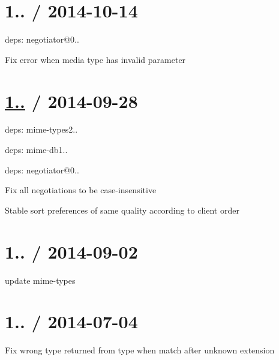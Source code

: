 \section*{1.. / 2014-\/10-\/14 }


\begin{DoxyItemize}
\item deps\+: negotiator@0..
\begin{DoxyItemize}
\item Fix error when media type has invalid parameter
\end{DoxyItemize}
\end{DoxyItemize}

\section*{\hyperlink{namespace1_1_11_1_11}{1..} / 2014-\/09-\/28 }


\begin{DoxyItemize}
\item deps\+: mime-\/types2..
\begin{DoxyItemize}
\item deps\+: mime-\/db1..
\end{DoxyItemize}
\item deps\+: negotiator@0..
\begin{DoxyItemize}
\item Fix all negotiations to be case-\/insensitive
\item Stable sort preferences of same quality according to client order
\end{DoxyItemize}
\end{DoxyItemize}

\section*{1.. / 2014-\/09-\/02 }


\begin{DoxyItemize}
\item update {\ttfamily mime-\/types}
\end{DoxyItemize}

\section*{1.. / 2014-\/07-\/04 }


\begin{DoxyItemize}
\item Fix wrong type returned from {\ttfamily type} when match after unknown extension
\end{DoxyItemize}


